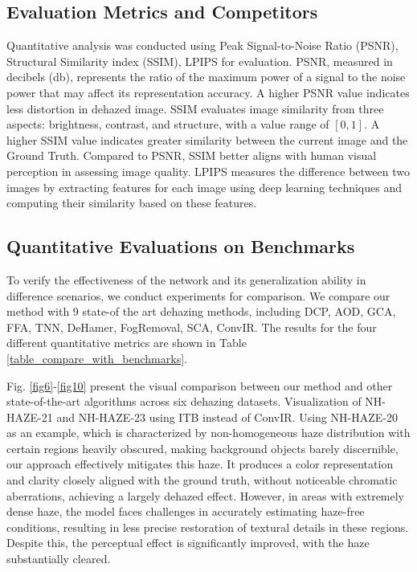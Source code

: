 \documentclass[lettersize,journal]{IEEEtran}
\begin{document}
\subsection{Evaluation Metrics and Competitors}
Quantitative analysis was conducted using Peak Signal-to-Noise Ratio (PSNR), Structural Similarity index (SSIM)\cite{wang2004image}, LPIPS\cite{zhang2018unreasonable} for evaluation. PSNR, measured in decibels (db), represents the ratio of the maximum power of a signal to the noise power that may affect its representation accuracy. A higher PSNR value indicates less distortion in dehazed image. SSIM evaluates image similarity from three aspects: brightness, contrast, and structure, with a value range of $[0,1]$. A higher SSIM value indicates greater similarity between the current image and the Ground Truth. Compared to PSNR, SSIM better aligns with human visual perception in assessing image quality. LPIPS measures the difference between two images by extracting features for each image using deep learning techniques and computing their similarity based on these features.
 
\subsection{Quantitative Evaluations on Benchmarks}
To verify the effectiveness of the network and its generalization ability in difference scenarios, we conduct experiments for comparison. We compare our method with 9 state-of the art dehazing methods, including DCP\cite{he2010single}, AOD\cite{li2017aod}, GCA\cite{chen2019gated}, FFA\cite{qin2020ffa}, TNN\cite{yu2021two}, DeHamer\cite{guo2022image}, FogRemoval\cite{jin2022structure}, SCA\cite{guo2023scanet}, ConvIR\cite{cui2024revitalizing}. The results for the four different quantitative metrics are shown in Table \ref{table_compare_with_benchmarks}.

Fig. \ref{fig6}-\ref{fig10} present the visual comparison between our method and other state-of-the-art algorithms across six dehazing datasets. Visualization of NH-HAZE-21 and NH-HAZE-23 using ITB\cite{liu2023data} instead of ConvIR. Using NH-HAZE-20 as an example, which is characterized by non-homogeneous haze distribution with certain regions heavily obscured, making background objects barely discernible, our approach effectively mitigates this haze. It produces a color representation and clarity closely aligned with the ground truth, without noticeable chromatic aberrations, achieving a largely dehazed effect. However, in areas with extremely dense haze, the model faces challenges in accurately estimating haze-free conditions, resulting in less precise restoration of textural details in these regions. Despite this, the perceptual effect is significantly improved, with the haze substantially cleared.
\end{document}
